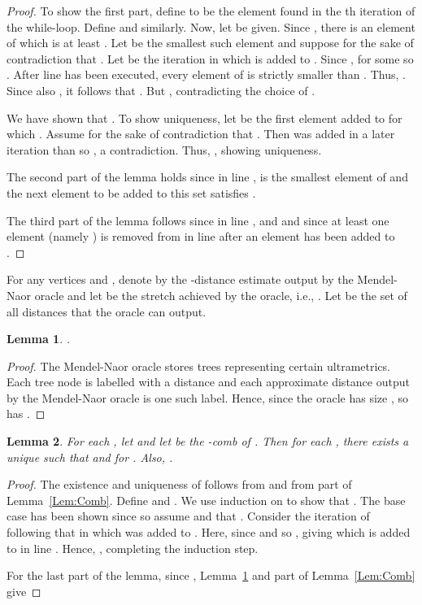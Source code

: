 \documentclass[11pt]{article}
\newtheorem{Lem}{Lemma}
\begin{document}
\begin{proof}
To show the first part,
define  to be the element  found in the th iteration of the while-loop. Define  and 
similarly. Now, let  be given. Since , there is an element of  which is at least .
Let  be the smallest such element and suppose for the sake of contradiction that .
Let  be the iteration in which  is added to . Since ,  for some 
so . After line  has been executed, every element of
 is strictly smaller than . Thus, . Since also
, it follows that
. But , contradicting the choice of .

We have shown that . To show uniqueness, let  be the first element added to 
for which . Assume for the sake of contradiction that . Then  was added
in a later iteration than  so ,
a contradiction. Thus, , showing uniqueness.

The second part of the lemma holds since in line ,  is the smallest element of  and the
next element  to be added to this set satisfies .

The third part of the lemma follows since in line ,
 and  and since at least one element (namely ) is removed from  in line  after
an element has been added to .
\end{proof}

For any vertices  and , denote by  the -distance estimate output by the Mendel-Naor oracle and let
 be the stretch achieved by the oracle, i.e., .
Let  be the set of all distances that the oracle can output.
\begin{Lem}\label{Lem:DMNBound}
.
\end{Lem}
\begin{proof}
The Mendel-Naor oracle stores trees representing certain ultrametrics. Each tree node is labelled with a distance and each
approximate distance output
by the Mendel-Naor oracle is one such label. Hence, since the oracle has size , so has .
\end{proof}
\begin{Lem}\label{Lem:EpsilonComb}
For each , let
 and let
 be the -comb of . Then for each ,
there exists a unique  such that  and
 for .
Also, .
\end{Lem}
\begin{proof}
The existence and uniqueness of  follows from  and from part
 of Lemma~\ref{Lem:Comb}. Define  and .
We use induction on  to show that . The base case  has
been shown since  so assume 
and that . Consider the iteration of
 following that in which  was added to . Here,
 since  and so ,
giving  which
is added to  in line . Hence, , completing the induction step.

For the last part of the lemma, since ,
Lemma~\ref{Lem:DMNBound} and part  of Lemma~\ref{Lem:Comb} give

\end{proof}
\end{document}
